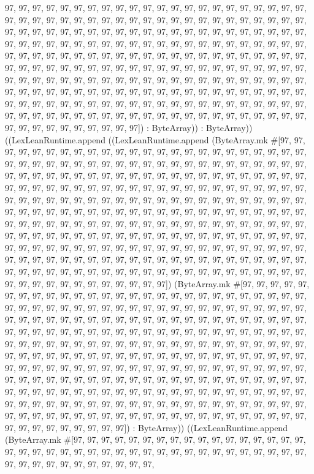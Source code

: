 \documentclass[11pt]{article}
\begin{document}
97, 97, 97, 97, 97, 97, 97, 97, 97, 97, 97, 97, 97, 97, 97, 97, 97, 97, 97, 97, 97, 97, 97, 97, 97, 97, 97, 97, 97, 97, 97, 97, 97, 97, 97, 97, 97, 97, 97, 97, 97, 97, 97, 97, 97, 97, 97, 97, 97, 97, 97, 97, 97, 97, 97, 97, 97, 97, 97, 97, 97, 97, 97, 97, 97, 97, 97, 97, 97, 97, 97, 97, 97, 97, 97, 97, 97, 97, 97, 97, 97, 97, 97, 97, 97, 97, 97, 97, 97, 97, 97, 97, 97, 97, 97, 97, 97, 97, 97, 97, 97, 97, 97, 97, 97, 97, 97, 97, 97, 97, 97, 97, 97, 97, 97, 97, 97, 97, 97, 97, 97, 97, 97, 97, 97, 97, 97, 97, 97, 97, 97, 97, 97, 97, 97, 97, 97, 97, 97, 97, 97, 97, 97, 97, 97, 97, 97, 97, 97, 97, 97, 97, 97, 97, 97, 97, 97, 97, 97, 97, 97, 97, 97, 97, 97, 97, 97, 97, 97, 97, 97, 97, 97, 97, 97, 97, 97, 97, 97, 97, 97, 97, 97, 97, 97, 97, 97, 97, 97, 97, 97, 97, 97, 97, 97, 97, 97, 97, 97, 97, 97, 97, 97, 97, 97, 97, 97, 97, 97, 97, 97, 97, 97, 97, 97, 97, 97, 97, 97, 97, 97, 97, 97, 97, 97, 97, 97, 97, 97, 97]) : ByteArray)) : ByteArray)) ((LexLeanRuntime.append ((LexLeanRuntime.append (ByteArray.mk \#[97, 97, 97, 97, 97, 97, 97, 97, 97, 97, 97, 97, 97, 97, 97, 97, 97, 97, 97, 97, 97, 97, 97, 97, 97, 97, 97, 97, 97, 97, 97, 97, 97, 97, 97, 97, 97, 97, 97, 97, 97, 97, 97, 97, 97, 97, 97, 97, 97, 97, 97, 97, 97, 97, 97, 97, 97, 97, 97, 97, 97, 97, 97, 97, 97, 97, 97, 97, 97, 97, 97, 97, 97, 97, 97, 97, 97, 97, 97, 97, 97, 97, 97, 97, 97, 97, 97, 97, 97, 97, 97, 97, 97, 97, 97, 97, 97, 97, 97, 97, 97, 97, 97, 97, 97, 97, 97, 97, 97, 97, 97, 97, 97, 97, 97, 97, 97, 97, 97, 97, 97, 97, 97, 97, 97, 97, 97, 97, 97, 97, 97, 97, 97, 97, 97, 97, 97, 97, 97, 97, 97, 97, 97, 97, 97, 97, 97, 97, 97, 97, 97, 97, 97, 97, 97, 97, 97, 97, 97, 97, 97, 97, 97, 97, 97, 97, 97, 97, 97, 97, 97, 97, 97, 97, 97, 97, 97, 97, 97, 97, 97, 97, 97, 97, 97, 97, 97, 97, 97, 97, 97, 97, 97, 97, 97, 97, 97, 97, 97, 97, 97, 97, 97, 97, 97, 97, 97, 97, 97, 97, 97, 97, 97, 97, 97, 97, 97, 97, 97, 97, 97, 97, 97, 97, 97, 97, 97, 97, 97, 97, 97, 97, 97, 97, 97, 97, 97, 97, 97, 97, 97, 97, 97, 97, 97, 97, 97, 97, 97, 97, 97, 97, 97, 97, 97, 97]) (ByteArray.mk \#[97, 97, 97, 97, 97, 97, 97, 97, 97, 97, 97, 97, 97, 97, 97, 97, 97, 97, 97, 97, 97, 97, 97, 97, 97, 97, 97, 97, 97, 97, 97, 97, 97, 97, 97, 97, 97, 97, 97, 97, 97, 97, 97, 97, 97, 97, 97, 97, 97, 97, 97, 97, 97, 97, 97, 97, 97, 97, 97, 97, 97, 97, 97, 97, 97, 97, 97, 97, 97, 97, 97, 97, 97, 97, 97, 97, 97, 97, 97, 97, 97, 97, 97, 97, 97, 97, 97, 97, 97, 97, 97, 97, 97, 97, 97, 97, 97, 97, 97, 97, 97, 97, 97, 97, 97, 97, 97, 97, 97, 97, 97, 97, 97, 97, 97, 97, 97, 97, 97, 97, 97, 97, 97, 97, 97, 97, 97, 97, 97, 97, 97, 97, 97, 97, 97, 97, 97, 97, 97, 97, 97, 97, 97, 97, 97, 97, 97, 97, 97, 97, 97, 97, 97, 97, 97, 97, 97, 97, 97, 97, 97, 97, 97, 97, 97, 97, 97, 97, 97, 97, 97, 97, 97, 97, 97, 97, 97, 97, 97, 97, 97, 97, 97, 97, 97, 97, 97, 97, 97, 97, 97, 97, 97, 97, 97, 97, 97, 97, 97, 97, 97, 97, 97, 97, 97, 97, 97, 97, 97, 97, 97, 97, 97, 97, 97, 97, 97, 97, 97, 97, 97, 97, 97, 97, 97, 97, 97, 97, 97, 97, 97, 97, 97, 97, 97, 97, 97, 97, 97, 97, 97, 97, 97, 97, 97, 97, 97, 97, 97, 97, 97, 97, 97, 97, 97, 97]) : ByteArray)) ((LexLeanRuntime.append (ByteArray.mk \#[97, 97, 97, 97, 97, 97, 97, 97, 97, 97, 97, 97, 97, 97, 97, 97, 97, 97, 97, 97, 97, 97, 97, 97, 97, 97, 97, 97, 97, 97, 97, 97, 97, 97, 97, 97, 97, 97, 97, 97, 97, 97, 97, 97, 97, 97, 97, 97, 97, 97, 
\end{document}
